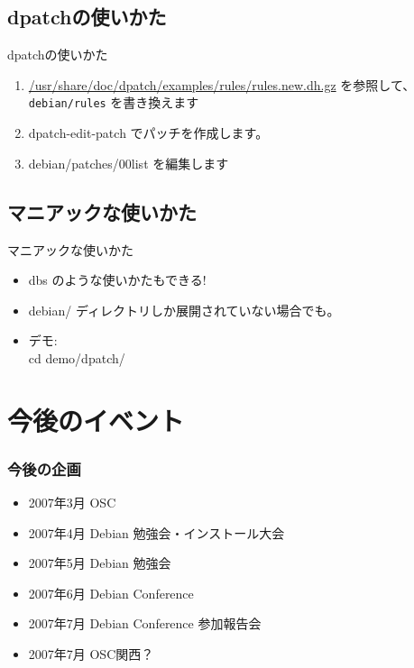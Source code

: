 \documentclass[cjk,dvipdfmx]{beamer}
\begin{document}
\subsection{dpatchの使いかた}
\begin{frame}{dpatchの使いかた}
\begin{enumerate}
 \item  \url{/usr/share/doc/dpatch/examples/rules/rules.new.dh.gz} を参照して、
 \texttt{ debian/rules} を書き換えます
 \item dpatch-edit-patch でパッチを作成します。
 \item debian/patches/00list を編集します
\end{enumerate}
\end{frame}

\subsection{マニアックな使いかた}
\begin{frame}{マニアックな使いかた}

\begin{itemize}
 \item  dbs のような使いかたもできる!

 \item  debian/ ディレクトリしか展開されていない場合でも。

 \item  デモ:\\
 cd demo/dpatch/
\end{itemize}

\end{frame}


\section{今後のイベント}

\begin{frame}
 \frametitle{今後の企画}
 \begin{itemize}
  \item 2007年3月 OSC
  \item 2007年4月 Debian 勉強会・インストール大会
  \item 2007年5月 Debian 勉強会
  \item 2007年6月 Debian Conference
  \item 2007年7月 Debian Conference 参加報告会
  \item 2007年7月 OSC関西？
 \end{itemize}
\end{frame}
\end{document}
